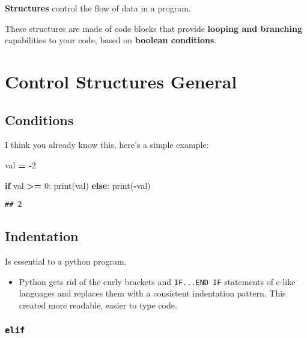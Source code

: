 \documentclass[
]{book}
\newenvironment{Shaded}{\begin{snugshade}}{\end{snugshade}}
\newcommand{\BuiltInTok}[1]{#1}
\newcommand{\ControlFlowTok}[1]{\textcolor[rgb]{0.13,0.29,0.53}{\textbf{#1}}}
\newcommand{\DecValTok}[1]{\textcolor[rgb]{0.00,0.00,0.81}{#1}}
\newcommand{\NormalTok}[1]{#1}
\newcommand{\OperatorTok}[1]{\textcolor[rgb]{0.81,0.36,0.00}{\textbf{#1}}}
\providecommand{\tightlist}{%
  \setlength{\itemsep}{0pt}\setlength{\parskip}{0pt}}
\begin{document}
\textbf{Structures} control the flow of data in a program.

These structures are made of code blocks that provide \textbf{looping and branching} capabilities to your code, based on \textbf{boolean conditions}.

\section{Control Structures General}\label{control-structures-general}

\subsection{Conditions}\label{conditions}

I think you already know this, here's a simple example:

\begin{Shaded}
\begin{Highlighting}[]
\NormalTok{val }\OperatorTok{=} \OperatorTok{{-}}\DecValTok{2}

\ControlFlowTok{if}\NormalTok{ val }\OperatorTok{\textgreater{}=} \DecValTok{0}\NormalTok{:}
    \BuiltInTok{print}\NormalTok{(val)}
\ControlFlowTok{else}\NormalTok{:}
    \BuiltInTok{print}\NormalTok{(}\OperatorTok{{-}}\NormalTok{val)}
\end{Highlighting}
\end{Shaded}

\begin{verbatim}
## 2
\end{verbatim}

\subsection{Indentation}\label{indentation}

Is essential to a python program.

\begin{itemize}
\tightlist
\item
  Python gets rid of the curly brackets and \texttt{IF...END\ IF} statements of c-like languages and replaces them with a consistent indentation pattern. This created more readable, easier to type code.
\end{itemize}

\subsubsection{\texorpdfstring{\textbf{\texttt{elif}}}{elif}}\label{elif}
\end{document}
